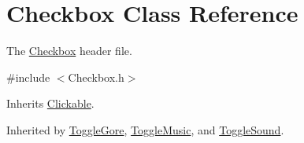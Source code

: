 \hypertarget{class_checkbox}{\section{Checkbox Class Reference}
\label{class_checkbox}
}


The \hyperlink{class_checkbox}{Checkbox} header file.  




{\ttfamily \#include $<$Checkbox.\+h$>$}



Inherits \hyperlink{class_clickable}{Clickable}.



Inherited by \hyperlink{class_toggle_gore}{Toggle\+Gore}, \hyperlink{class_toggle_music}{Toggle\+Music}, and \hyperlink{class_toggle_sound}{Toggle\+Sound}.

